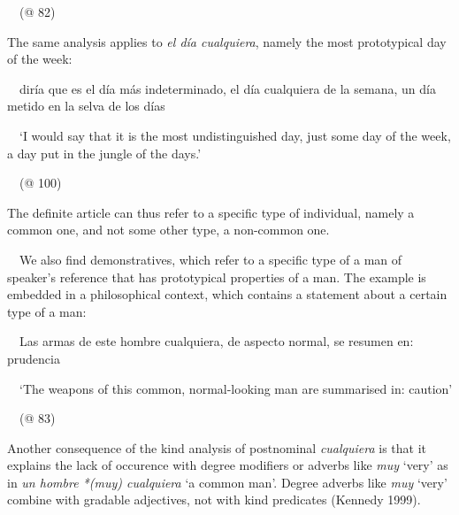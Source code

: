 \begin{styleStandard}
\ \ (@ 82)
\end{styleStandard}

\begin{styleStandard}
The same analysis applies to \textit{el día cualquiera}, namely the most prototypical day of the week:
\end{styleStandard}

\begin{styleStandard}
\ \ diría que es el día más indeterminado, el día cualquiera de la semana, un día metido en la selva de los días
\end{styleStandard}

\begin{styleStandard}
\ \ ‘I would say that it is the most undistinguished day, just some day of the week, a day put in the jungle of the days.’
\end{styleStandard}

\begin{styleStandard}
\ \ (@ 100)
\end{styleStandard}

\begin{styleStandard}
The definite article can thus refer to a specific type of individual, namely a common one, and not some other type, a non-common one. 
\end{styleStandard}

\begin{styleStandard}
\ \ We also find demonstratives, which refer to a specific type of a man of speaker’s reference that has prototypical properties of a man. The example is embedded in a philosophical context, which contains a statement about a certain type of a man:
\end{styleStandard}

\begin{styleStandard}
\label{bkm:Ref63545989}\ \ Las armas de este hombre cualquiera, de aspecto normal, se resumen en: prudencia
\end{styleStandard}

\begin{styleStandard}
\ \ ‘The weapons of this common, normal-looking man are summarised in: caution’
\end{styleStandard}

\begin{styleStandard}
\ \ (@ 83)
\end{styleStandard}

\begin{styleStandard}
Another consequence of the kind analysis of postnominal \textit{cualquiera} is that it explains the lack of occurence with degree modifiers or adverbs like \textit{muy} ‘very’ as in \textit{un hombre *(muy) cualquiera} ‘a common man’. Degree adverbs like \textit{muy} ‘very’ combine with gradable adjectives, not with kind predicates (Kennedy 1999). 
\end{styleStandard}

